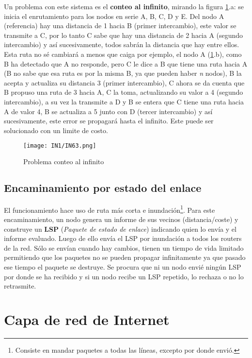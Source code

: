 \documentclass[
	12pt, %
	fleqn, %
	a4paper, %
]{LegrandOrangeBook}
\begin{document}
Un problema con este sistema es el \textbf{conteo al infinito}, mirando la figura \ref{fig:cont inf}.a: se inicia el enrutamiento para los nodos en serie A, B, C, D y E. Del nodo A (referencia) hay una distancia de 1 hacia B (primer intercambio), este valor se transmite a C, por lo tanto C sabe que hay una distancia de 2 hacia A (segundo intercambio) y así sucesivamente, todos sabrán la distancia que hay entre ellos. Esta ruta no sé cambiará a menos que caiga por ejemplo, el nodo A (\ref{fig:cont inf}.b), como B ha detectado que A no responde, pero C le dice a B que tiene una ruta hacia A (B no sabe que esa ruta es por la misma B, ya que pueden haber \textit{n} nodos), B la acepta y actualiza su distancia 3 (primer intercambio), C ahora se da cuenta que B propuso una ruta de 3 hacia A, C la toma, actualizando su valor a 4 (segundo intercambio), a su vez la transmite a D y B se entera que C tiene una ruta hacia A de valor 4, B se actualiza a 5 junto con D (tercer intercambio) y así sucesivamente, este error se propagará hasta el infinito. Este puede ser solucionado con un limite de costo.
\begin{figure}[]
\centering
\texttt{[image: IN1/IN63.png]}
\caption{Problema conteo al infinito}
\label{fig:cont inf}
\end{figure}
\subsection{Encaminamiento por estado del enlace}
El funcionamiento hace uso de ruta más corta e inundación\footnote{Consiste en mandar paquetes a todas las líneas, excepto por donde envió.}. Para este encaminamiento, un nodo genera un informe de sus vecinos (distancia/coste) y construye un \textbf{LSP} (\emph{Paquete de estado de enlace}) indicando quien lo envía y el informe evaluado. Luego de ello envía el LSP por inundación a todos los routers de la red. Sólo se envían cuando hay cambios, tienen un tiempo de vida limitado permitiendo que los paquetes no se pueden propagar infinitamente ya que pasado ese tiempo el paquete se destruye. Se procura que ni un nodo envié ningún LSP por donde se ha recibido y si un nodo recibe un LSP repetido, lo rechaza o no lo retrasmite.
\begin{example}
\end{example}
\section{Capa de red de Internet}
\end{document}
